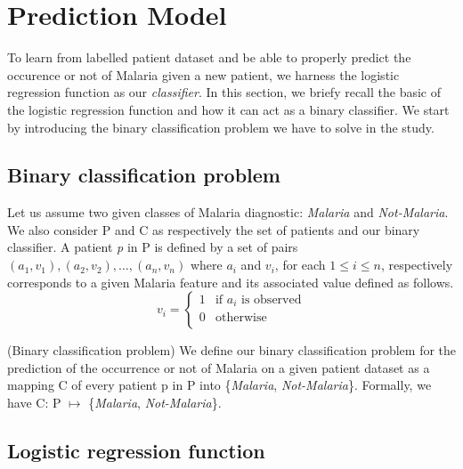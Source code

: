 \section{Prediction Model}\label{prediction_model}
To learn from labelled patient dataset and be able to properly predict 
the occurence or not of Malaria given a new patient, we harness the logistic 
regression function as our \emph{classifier}. 
In this section, we briefy recall the basic of the logistic regression function
and how it can act as a binary classifier. We start by introducing the binary 
classification problem we have to solve in the study.

\subsection{Binary classification problem}
Let us assume two given classes of Malaria diagnostic: \emph{Malaria} and \emph{Not-Malaria}.
We also consider \textsc{P} and \textsc{C} as respectively the set of patients and our binary classifier.
A patient \emph{p} in \textsc{P} is defined by a set of pairs $(a_1, v_1), (a_2, v_2), \ldots, (a_n, v_n)$
where $a_i$ and $v_i$, for each $1\leq i\leq n$, respectively corresponds to a given Malaria feature and its associated value defined
as follows.
\begin{equation}
v_i = \left\{
\begin{array}{rl}
1& \text{if $a_i$ is observed} \\
0& \text{otherwise} \\
\end{array}
\right.
\end{equation}

\begin{definition}{(Binary classification problem)}
We define our binary classification problem for the prediction of the occurrence or not of Malaria on a given patient dataset as a 
mapping \textsc{C} of every patient p in \textsc{P} into \{\emph{Malaria}, \emph{Not-Malaria}\}. Formally, we have \textsc{C}: \textsc{P} $\mapsto$ \{\emph{Malaria}, \emph{Not-Malaria}\}.
\end{definition}
\subsection{Logistic regression function}
